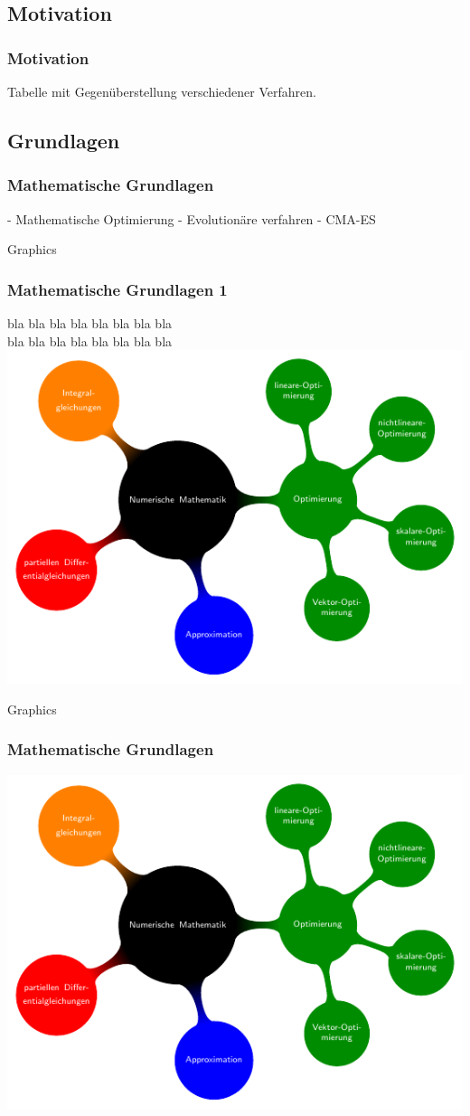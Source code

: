 \subsection{Motivation}
\begin{frame} %
  \frametitle{Motivation}
  
  	Tabelle mit Gegenüberstellung verschiedener Verfahren.
  	
\end{frame}
\subsection{Grundlagen}
\begin{frame} %
  \frametitle{Mathematische Grundlagen}
  	- Mathematische Optimierung
	- Evolutionäre verfahren
	- CMA-ES
\end{frame}
\begin{frame}{Graphics} 
	\frametitle{Mathematische Grundlagen 1 }
	bla bla bla bla bla bla bla bla \\ bla bla bla bla  bla bla bla bla 
	\includegraphics[page=2, width=.6\textwidth]{../img/mindmap.pdf}
\end{frame}
\begin{frame}{Graphics} 
  	\frametitle{Mathematische Grundlagen }
	\includegraphics[page=1, width=.6\textwidth]{../img/mindmap.pdf}
\end{frame}
